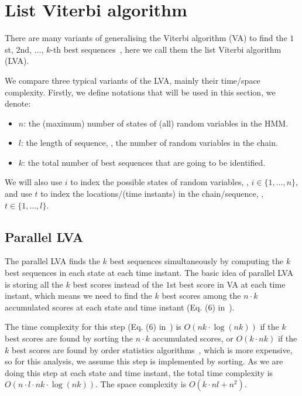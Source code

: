 \section{List Viterbi algorithm}
\label{sec:lva}

There are many variants of generalising the Viterbi algorithm (VA) to find the 
$1$st, $2$nd, $\dots$, $k$-th best sequences~\cite{seshadri1994list,nilsson2001sequentially},
here we call them the list Viterbi algorithm (LVA).

We compare three typical variants of the LVA, mainly their time/space complexity.
Firstly, we define notations that will be used in this section, we denote:
\begin{itemize}
\item $n$: the (maximum) number of states of (all) random variables in the HMM.
\item $l$: the length of sequence, \ie, the number of random variables in the chain.
\item $k$: the total number of best sequences that are going to be identified.
\end{itemize}
We will also use $i$ to index the possible states of random variables, \ie, $i \in \{1, \dots, n\}$,
and use $t$ to index the locations/(time instants) in the chain/sequence, \ie, $t \in \{1, \dots, l\}$.

\subsection{Parallel LVA}
\label{sec:plva}

The parallel LVA finds the $k$ best sequences simultaneously by computing the $k$ best sequences in each state at each time instant.
The basic idea of parallel LVA is storing all the $k$ best scores instead of the $1$st best score in VA at each time instant,
which means we need to find the $k$ best scores among the $n\cdot k$ accumulated scores at each state and time instant 
(Eq. (6) in~\cite{seshadri1994list}).

The time complexity for this step (Eq. (6) in~\cite{seshadri1994list})
is $O \left( nk\cdot \log(nk) \right)$ if the $k$ best scores are found by sorting the $n\cdot k$ accumulated scores,
or $O \left( k \cdot nk \right)$ if the $k$ best scores are found by order statistics algorithms~\cite{clrs2009}, which is more expensive,
so for this analysis, we assume this step is implemented by sorting.
As we are doing this step at each state and time instant, the total time complexity is $O \left( n \cdot l \cdot nk \cdot \log(nk) \right)$.
The space complexity is $O \left( k \cdot nl + n^2 \right)$.


